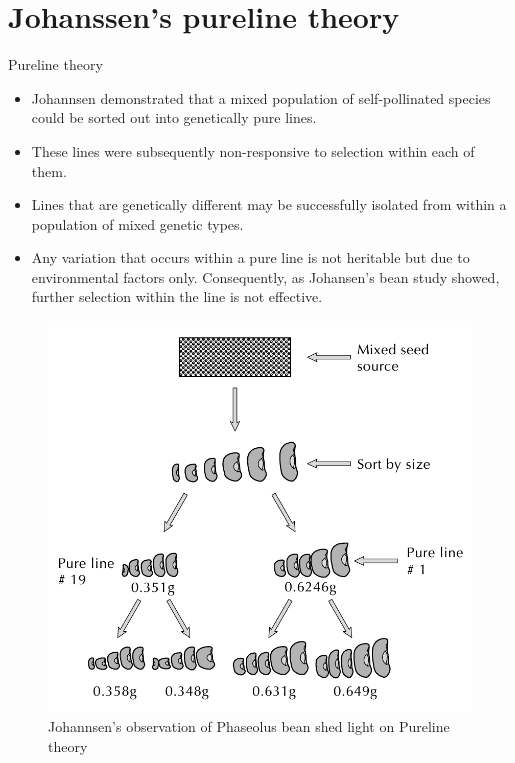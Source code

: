 \documentclass[11pt,dvipsnames,ignorenonframetext,aspectratio=169]{beamer}
\providecommand{\tightlist}{%
  \setlength{\itemsep}{0pt}\setlength{\parskip}{0pt}}
\begin{document}
\hypertarget{johanssens-pureline-theory}{%
\section{Johanssen's pureline theory}\label{johanssens-pureline-theory}}

\begin{frame}{Pureline theory}
\protect\hypertarget{pureline-theory}{}

\begin{itemize}
\tightlist
\item
  Johannsen demonstrated that a mixed population of self-pollinated
  species could be sorted out into genetically pure lines.
\item
  These lines were subsequently non-responsive to selection within each
  of them.
\item
  Lines that are genetically different may be successfully isolated from
  within a population of mixed genetic types.
\item
  Any variation that occurs within a pure line is not heritable but due
  to environmental factors only. Consequently, as Johansen's bean study
  showed, further selection within the line is not effective.
\end{itemize}

\end{frame}

\begin{frame}{}
\protect\hypertarget{section-1}{}

\begin{figure}

{\centering \includegraphics[width=0.45\linewidth]{../images/johannsens_purlines} 

}

\caption{Johannsen's observation of Phaseolus bean shed light on Pureline theory}\label{fig:johannsens-purelines}
\end{figure}

\end{frame}
\end{document}
